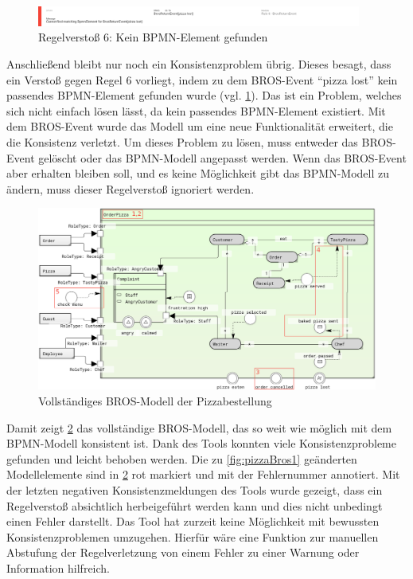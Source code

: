 \begin{figure}[H]
    \centering
    \includegraphics[width=0.95\textwidth,keepaspectratio]{../images/example/error6.png}%
    \caption{Regelverstoß 6: Kein BPMN-Element gefunden}%
    \label{fig:error6}
\end{figure}

Anschließend bleibt nur noch ein Konsistenzproblem übrig.
Dieses besagt, dass ein Verstoß gegen Regel 6 vorliegt, indem zu dem BROS-Event ``pizza lost'' kein passendes BPMN-Element gefunden wurde (vgl. \cref{fig:error6}).
Das ist ein Problem, welches sich nicht einfach lösen lässt, da kein passendes BPMN-Element existiert.
Mit dem BROS-Event wurde das Modell um eine neue Funktionalität erweitert, die die Konsistenz verletzt.
Um dieses Problem zu lösen, muss entweder das BROS-Event gelöscht oder das BPMN-Modell angepasst werden.
Wenn das BROS-Event aber erhalten bleiben soll, und es keine Möglichkeit gibt das BPMN-Modell zu ändern, muss dieser Regelverstoß ignoriert werden.

\begin{figure}
    \centering
    \includegraphics[width=\textwidth,keepaspectratio]{../images/example/bros-rule6H.png}%
    \caption{Vollständiges BROS-Modell der Pizzabestellung}%
    \label{fig:pizzaBros6}
\end{figure}

Damit zeigt \cref{fig:pizzaBros6} das vollständige BROS-Modell, das so weit wie möglich mit dem BPMN-Modell konsistent ist.
Dank des Tools konnten viele Konsistenzprobleme gefunden und leicht behoben werden.
Die zu \cref{fig:pizzaBros1} geänderten Modellelemente sind in \cref{fig:pizzaBros6} rot markiert und mit der Fehlernummer annotiert.
Mit der letzten negativen Konsistenzmeldungen des Tools wurde gezeigt, dass ein Regelverstoß absichtlich herbeigeführt werden kann und dies nicht unbedingt einen Fehler darstellt.
Das Tool hat zurzeit keine Möglichkeit mit bewussten Konsistenzproblemen umzugehen.
Hierfür wäre eine Funktion zur manuellen Abstufung der Regelverletzung von einem Fehler zu einer Warnung oder Information hilfreich.

